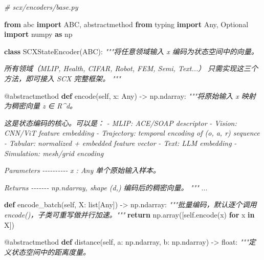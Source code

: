 \documentclass[
  12pt,
]{ctexart}
\newenvironment{Shaded}{}{}
\newcommand{\AttributeTok}[1]{\textcolor[rgb]{0.49,0.56,0.16}{#1}}
\newcommand{\BuiltInTok}[1]{\textcolor[rgb]{0.00,0.50,0.00}{#1}}
\newcommand{\CommentTok}[1]{\textcolor[rgb]{0.38,0.63,0.69}{\textit{#1}}}
\newcommand{\ControlFlowTok}[1]{\textcolor[rgb]{0.00,0.44,0.13}{\textbf{#1}}}
\newcommand{\ImportTok}[1]{\textcolor[rgb]{0.00,0.50,0.00}{\textbf{#1}}}
\newcommand{\KeywordTok}[1]{\textcolor[rgb]{0.00,0.44,0.13}{\textbf{#1}}}
\newcommand{\NormalTok}[1]{#1}
\newcommand{\OperatorTok}[1]{\textcolor[rgb]{0.40,0.40,0.40}{#1}}
\newcommand{\VariableTok}[1]{\textcolor[rgb]{0.10,0.09,0.49}{#1}}
\begin{document}
\begin{Shaded}
\begin{Highlighting}[]
\CommentTok{\# scx/encoders/base.py}

\ImportTok{from}\NormalTok{ abc }\ImportTok{import}\NormalTok{ ABC, abstractmethod}
\ImportTok{from}\NormalTok{ typing }\ImportTok{import}\NormalTok{ Any, Optional}
\ImportTok{import}\NormalTok{ numpy }\ImportTok{as}\NormalTok{ np}


\KeywordTok{class}\NormalTok{ SCXStateEncoder(ABC):}
    \CommentTok{"""将任意领域输入 x 编码为状态空间中的向量。}

\CommentTok{    所有领域（MLIP, Health, CIFAR, Robot, FEM, Semi, Text...）}
\CommentTok{    只需实现这三个方法，即可接入 SCX 完整框架。}
\CommentTok{    """}

    \AttributeTok{@abstractmethod}
    \KeywordTok{def}\NormalTok{ encode(}\VariableTok{self}\NormalTok{, x: Any) }\OperatorTok{{-}\textgreater{}}\NormalTok{ np.ndarray:}
        \CommentTok{"""将原始输入 x 映射为稠密向量 z ∈ R\^{}d。}

\CommentTok{        这是状态编码的核心。可以是：}
\CommentTok{        {-} MLIP: ACE/SOAP descriptor}
\CommentTok{        {-} Vision: CNN/ViT feature embedding}
\CommentTok{        {-} Trajectory: temporal encoding of (o, a, r) sequence}
\CommentTok{        {-} Tabular: normalized + embedded feature vector}
\CommentTok{        {-} Text: LLM embedding}
\CommentTok{        {-} Simulation: mesh/grid encoding}

\CommentTok{        Parameters}
\CommentTok{        {-}{-}{-}{-}{-}{-}{-}{-}{-}{-}}
\CommentTok{        x : Any}
\CommentTok{            单个原始输入样本。}

\CommentTok{        Returns}
\CommentTok{        {-}{-}{-}{-}{-}{-}{-}}
\CommentTok{        np.ndarray, shape (d,)}
\CommentTok{            编码后的稠密向量。}
\CommentTok{        """}
\NormalTok{        ...}

    \KeywordTok{def}\NormalTok{ encode\_batch(}\VariableTok{self}\NormalTok{, X: }\BuiltInTok{list}\NormalTok{[Any]) }\OperatorTok{{-}\textgreater{}}\NormalTok{ np.ndarray:}
        \CommentTok{"""批量编码，默认逐个调用 encode()，子类可重写做并行加速。"""}
        \ControlFlowTok{return}\NormalTok{ np.array([}\VariableTok{self}\NormalTok{.encode(x) }\ControlFlowTok{for}\NormalTok{ x }\KeywordTok{in}\NormalTok{ X])}

    \AttributeTok{@abstractmethod}
    \KeywordTok{def}\NormalTok{ distance(}\VariableTok{self}\NormalTok{, a: np.ndarray, b: np.ndarray) }\OperatorTok{{-}\textgreater{}} \BuiltInTok{float}\NormalTok{:}
        \CommentTok{"""定义状态空间中的距离度量。}


\end{Highlighting}
\end{Shaded}
\end{document}
